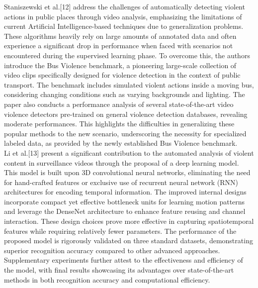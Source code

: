 \documentclass[conference]{IEEEtran}
\begin{document}
Staniszewski et al.[12] address the challenges of automatically detecting violent actions in public places through video analysis, emphasizing the limitations of current Artificial Intelligence-based techniques due to generalization problems. These algorithms heavily rely on large amounts of annotated data and often experience a significant drop in performance when faced with scenarios not encountered during the supervised learning phase. To overcome this, the authors introduce the Bus Violence benchmark, a pioneering large-scale collection of video clips specifically designed for violence detection in the context
of public transport. The benchmark includes simulated violent actions inside a moving bus, considering changing conditions such as varying backgrounds and lighting. The paper also conducts a performance analysis of several state-of-the-art video violence detectors pre-trained on general violence detection databases, revealing moderate performances. This highlights the difficulties in generalizing these popular methods to the new scenario, underscoring the necessity for specialized labeled data, as provided by the newly established Bus Violence benchmark.\\

Li et al.[13] present a significant contribution to the automated analysis of violent content in surveillance videos through the proposal of a deep learning model. This model is built upon 3D convolutional neural networks, eliminating the need for hand-crafted features or exclusive use of recurrent neural network (RNN) architectures for encoding temporal information. The improved internal designs incorporate compact yet effective bottleneck units for learning motion patterns and leverage the DenseNet architecture to enhance feature reusing and channel interaction. These design choices prove more effective in capturing spatiotemporal features while requiring relatively fewer parameters. The performance of the proposed model is rigorously validated on three standard datasets, demonstrating superior recognition accuracy compared to other advanced approaches. Supplementary experiments further attest to the effectiveness and efficiency of the model, with final results showcasing its advantages over state-of-the-art methods in both recognition accuracy and computational efficiency.\\
\end{document}
